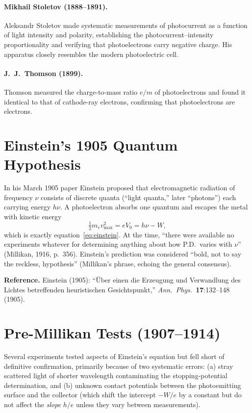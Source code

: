 \documentclass[12pt]{article}
\begin{document}
\paragraph{Mikhail Stoletov (1888--1891).}
Aleksandr Stoletov made systematic measurements of photocurrent as a function
of light intensity and polarity, establishing the photocurrent--intensity
proportionality and verifying that photoelectrons carry negative charge.
His apparatus closely resembles the modern photoelectric cell.

\paragraph{J.\ J.\ Thomson (1899).}
Thomson measured the charge-to-mass ratio $e/m$ of photoelectrons and found
it identical to that of cathode-ray electrons, confirming that photoelectrons
are electrons.

\section{Einstein's 1905 Quantum Hypothesis}

In his March 1905 paper Einstein proposed that electromagnetic radiation of
frequency $\nu$ consists of discrete quanta (``light quanta,'' later
``photons'') each carrying energy $h\nu$.  A photoelectron absorbs one quantum
and escapes the metal with kinetic energy
\[
  \tfrac{1}{2}m_e v^2_{\max} = eV_0 = h\nu - W,
\]
which is exactly equation~\eqref{eq:einstein}.  At the time, ``there were
available no experiments whatever for determining anything about how P.D.\ varies
with $\nu$'' (Millikan, 1916, p.~356).  Einstein's prediction was considered
``bold, not to say the reckless, hypothesis'' (Millikan's phrase, echoing the
general consensus).

\textbf{Reference.}  Einstein (1905): ``\"Uber einen die Erzeugung und
Verwandlung des Lichtes betreffenden heuristischen Gesichtspunkt,''
\emph{Ann.\ Phys.}\ \textbf{17}:132--148 (1905).  

\section{Pre-Millikan Tests (1907--1914)}

Several experiments tested aspects of Einstein's equation but fell short of
definitive confirmation, primarily because of two systematic errors: (a) stray
scattered light of shorter wavelength contaminating the stopping-potential
determination, and (b) unknown contact potentials between the photoemitting
surface and the collector (which shift the intercept $-W/e$ by a constant but
do not affect the \emph{slope} $h/e$ unless they vary between measurements).
\end{document}
